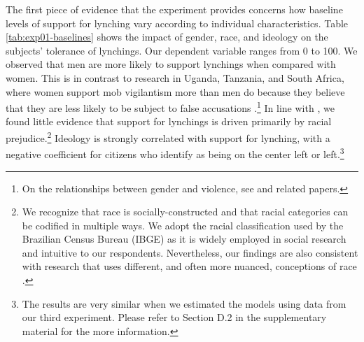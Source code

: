 \documentclass[12pt,a4paper]{article}
\begin{document}
The first piece of evidence that the experiment provides concerns how baseline levels of support for lynching vary according to individual characteristics. Table \ref{tab:exp01-baselines} shows the impact of gender, race, and ideology on the subjects' tolerance of lynchings. Our dependent variable ranges from 0 to 100. We observed that men are more likely to support lynchings when compared with women. This is in contrast to research in Uganda, Tanzania, and South Africa, where women support mob vigilantism more than men do because they believe that they are less likely to be subject to false accusations \citep{wilke2021gender}.\footnote{On the relationships between gender and violence, see \citet{kadera2018gendered} and related papers.} In line with \citet{martins2015linchamentos}, we found little evidence that support for lynchings is driven primarily by racial prejudice.\footnote{We recognize that race is socially-constructed and that racial categories can be codified in multiple ways. We adopt the racial classification used by the Brazilian Census Bureau (IBGE) as it is widely employed in social research \citep[e.g.][24]{lapop2018brazil} and intuitive to our respondents. Nevertheless, our findings are also consistent with research that uses different, and often more nuanced, conceptions of race \citep{monk2016consequences, schwartzman2020colour}. } Ideology is strongly correlated with support for lynching, with a negative coefficient for citizens who identify as being on the center left or left.\footnote{The results are very similar when we estimated the models using data from our third experiment. Please refer to Section D.2 in the supplementary material for the more information.}
\end{document}
